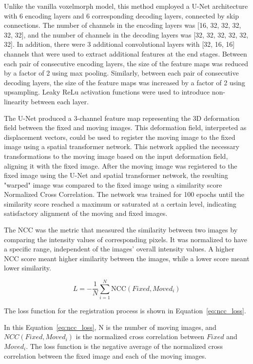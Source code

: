 \documentclass{report}
\begin{document}
	Unlike the vanilla voxelmorph model, this method employed a U-Net architecture with 6 encoding layers and 6 corresponding decoding layers, connected by skip connections. The number of channels in the encoding layers was [16, 32, 32, 32, 32, 32], and the number of channels in the decoding layers was [32, 32, 32, 32, 32, 32]. In addition, there were 3 additional convolutional layers with [32, 16, 16] channels that were used to extract additional features at the end stages. Between each pair of consecutive encoding layers, the size of the feature maps was reduced by a factor of 2 using max pooling. Similarly, between each pair of consecutive decoding layers, the size of the feature maps was increased by a factor of 2 using upsampling. Leaky ReLu activation functions were used to introduce non-linearity between each layer.
	
	The U-Net produced a 3-channel feature map representing the 3D deformation field between the fixed and moving images. This deformation field, interpreted as displacement vectors, could be used to register the moving image to the fixed image using a spatial transformer network. This network applied the necessary transformations to the moving image based on the input deformation field, aligning it with the fixed image. After the moving image was registered to the fixed image using the U-Net and spatial transformer network, the resulting "warped" image was compared to the fixed image using a similarity score Normalized Cross Correlation. The network was trained for 100 epochs until the similarity score reached a maximum or saturated at a certain level, indicating satisfactory alignment of the moving and fixed images.
	
	The NCC was the metric that measured the similarity between two images by comparing the intensity values of corresponding pixels. It was normalized to have a specific range, independent of the images' overall intensity values. A higher NCC score meant higher similarity between the images, while a lower score meant lower similarity.
	
	\begin{equation}\label{eq:ncc_loss}
	L = -\frac{1}{N} \sum_{i=1}^N \text{NCC}(Fixed, Moved_i)
	\end{equation}
	
	The loss function for the registration process is shown in Equation~\ref{eq:ncc_loss}.
	
	In this Equation~\ref{eq:ncc_loss}, N is the number of moving images, and $NCC(Fixed, Moved_i)$ is the normalized cross correlation between $Fixed$ and $Moved_i$. The loss function is the negative average of the normalized cross correlation between the fixed image and each of the moving images.
	
\end{document}
